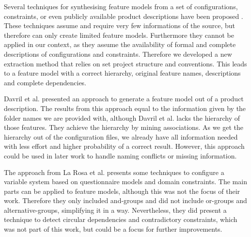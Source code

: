 

Several techniques for synthesising feature models from a set of configurations, constraints, or even publicly available product descriptions have been proposed \cite{zhang2013mining, becan2014webfml, davril2013feature}. These techniques assume and require very few informations of the source, but therefore can only create limited feature models. Furthermore they cannot be applied in our context, as they assume the availability of formal and complete descriptions of configurations and constraints. Therefore we developed a new extraction method that relies on set project structure and conventions. This leads to a feature model with a correct hierarchy, original feature names, descriptions and complete dependencies.

Davril et al. \cite{davril2013feature} presented an approach to generate a feature model out of a product description. The results from this approach equal to the information given by the folder names we are provided with, although Davril et al. lacks the hierarchy of those features. They achieve the hierarchy by mining associations. As we get the hierarchy out of the configuration files, we already have all information needed with less effort and higher probability of a correct result. However, this approach could be used in later work to handle naming conflicts or missing information.

The approach from La Rosa et al. \cite{qbvm} presents some techniques to configure a variable system based on questionnaire models and domain constraints. The main parts can be applied to feature models, although this was not the focus of their work. Therefore they only included and-groups and did not include or-groups and alternative-groups, simplifying it in a way. Nevertheless, they did present a technique to detect circular dependencies and contradictory constraints, which was not part of this work, but could be a focus for further improvements.